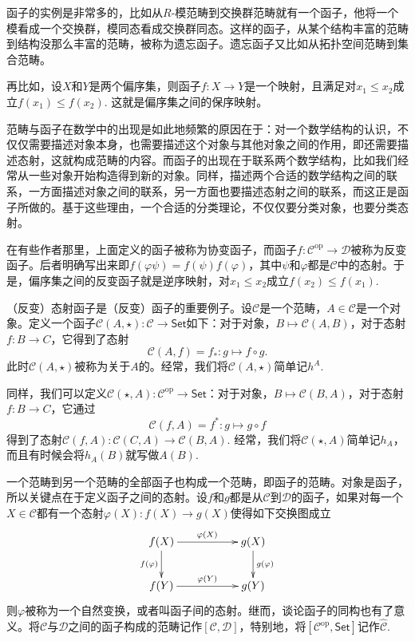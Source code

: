 函子的实例是非常多的，比如从$R$-模范畴到交换群范畴就有一个函子，他将一个模看成一个交换群，模同态看成交换群同态。这样的函子，从某个结构丰富的范畴到结构没那么丰富的范畴，被称为遗忘函子。遗忘函子又比如从拓扑空间范畴到集合范畴。

再比如，设$X$和$Y$是两个偏序集，则函子$f:X\to Y$是一个映射，且满足对$x_1\leq x_2$成立$f(x_1)\leq f(x_2)$. 这就是偏序集之间的保序映射。

范畴与函子在数学中的出现是如此地频繁的原因在于：对一个数学结构的认识，不仅仅需要描述对象本身，也需要描述这个对象与其他对象之间的作用，即还需要描述态射，这就构成范畴的内容。而函子的出现在于联系两个数学结构，比如我们经常从一些对象开始构造得到新的对象。同样，描述两个合适的数学结构之间的联系，一方面描述对象之间的联系，另一方面也要描述态射之间的联系，而这正是函子所做的。基于这些理由，一个合适的分类理论，不仅仅要分类对象，也要分类态射。

在有些作者那里，上面定义的函子被称为协变函子，而函子$f:\mathcal{C}^{\mathrm{op}} \to \mathcal{D}$被称为反变函子。后者明确写出来即$f(\varphi\psi)=f(\psi)f(\varphi)$，其中$\psi$和$\varphi$都是$\mathcal{C}$中的态射。于是，偏序集之间的反变函子就是逆序映射，对$x_1\leq x_2$成立$f(x_2)\leq f(x_1)$.

\para （反变）态射函子是（反变）函子的重要例子。设$\mathcal{C}$是一个范畴，$A\in \mathcal{C}$是一个对象。定义一个函子$\mathcal{C}(A,\star):\mathcal{C}\to \mathsf{Set}$如下：对于对象，$B\mapsto \mathcal{C}(A,B)$，对于态射$f:B\to C$，它得到了态射
\[
	\mathcal{C}(A,f)=f_*: g\mapsto f\circ g.
\]
此时$\mathcal{C}(A,\star)$被称为关于$A$的。经常，我们将$\mathcal{C}(A,\star)$简单记$h^A$.

同样，我们可以定义$\mathcal{C}(\star,A):\mathcal{C}^{\text{op}}\to \mathsf{Set}$：对于对象，$B\mapsto \mathcal{C}(B,A)$，对于态射$f:B\to C$，它通过
\[
	\mathcal{C}(f,A)=f^*: g\mapsto g\circ f
\]
得到了态射$\mathcal{C}(f,A):\mathcal{C}(C,A)\to \mathcal{C}(B,A)$. 经常，我们将$\mathcal{C}(\star,A)$简单记$h_A$，而且有时候会将$h_A(B)$就写做$A(B)$.

\para 一个范畴到另一个范畴的全部函子也构成一个范畴，即函子的范畴。对象是函子，所以关键点在于定义函子之间的态射。设$f$和$g$都是从$\mathcal{C}$到$\mathcal{D}$的函子，如果对每一个$X\in \mathcal{C}$都有一个态射$\varphi(X):f(X)\to g(X)$使得如下交换图成立
\[
\begin{xy}
	\xymatrix{
		f(X)\ar[rr]^{\varphi(X)} \ar[d]_{f(\varphi)}&&g(X) \ar[d]^{g(\varphi)}\\
		f(Y)\ar[rr]^{\varphi(Y)}&&g(Y)
	}
\end{xy}
\]
则$\varphi$被称为一个自然变换，或者叫函子间的态射。继而，谈论函子的同构也有了意义。将$\mathcal{C}$与$\mathcal{D}$之间的函子构成的范畴记作$[\mathcal{C},\mathcal{D}]$，特别地，将$[\mathcal{C}^\text{op},\mathsf{Set}]$记作$\hat{\mathcal{C}}$.

